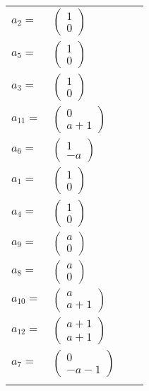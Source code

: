 \documentclass[1p]{elsarticle_modified}
\theoremstyle{definition}
\begin{document}
\begin{tabular}{m{7pt} m{180pt} m{7pt} m{180pt} }
\flushright $a_{2}=$&$\begin{pmatrix}1\\0\end{pmatrix}$ \\
\flushright $a_{5}=$&$\begin{pmatrix}1\\0\end{pmatrix}$ \\
\flushright $a_{3}=$&$\begin{pmatrix}1\\0\end{pmatrix}$ \\
\flushright $a_{11}=$&$\begin{pmatrix}0\\a+1\end{pmatrix}$ \\
\flushright $a_{6}=$&$\begin{pmatrix}1\\- a\end{pmatrix}$ \\
\flushright $a_{1}=$&$\begin{pmatrix}1\\0\end{pmatrix}$ \\
\flushright $a_{4}=$&$\begin{pmatrix}1\\0\end{pmatrix}$ \\
\flushright $a_{9}=$&$\begin{pmatrix}a\\0\end{pmatrix}$ \\
\flushright $a_{8}=$&$\begin{pmatrix}a\\0\end{pmatrix}$ \\
\flushright $a_{10}=$&$\begin{pmatrix}a\\a+1\end{pmatrix}$ \\
\flushright $a_{12}=$&$\begin{pmatrix}a+1\\a+1\end{pmatrix}$ \\
\flushright $a_{7}=$&$\begin{pmatrix}0\\- a-1\end{pmatrix}$\\&\end{tabular}
\end{document}
